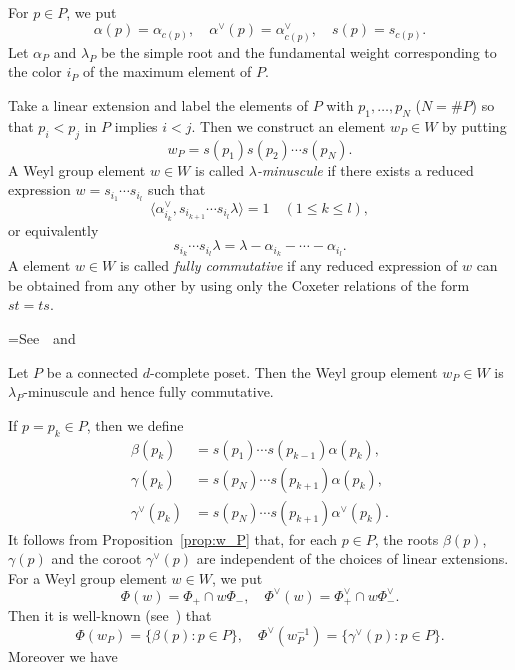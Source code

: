 For $p \in P$, we put
$$
\alpha(p) = \alpha_{c(p)},
\quad
\alpha^\vee(p) = \alpha^\vee_{c(p)},
\quad
s(p) = s_{c(p)}.
$$
Let $\alpha_P$ and $\lambda_P$ be the simple root and the fundamental weight 
corresponding to the color $i_P$ of the maximum element of $P$. 

Take a linear extension and label the elements of $P$ with $p_1, \ldots, p_N$ ($N= \# P$) 
so that $p_i < p_j$ in $P$ implies $i<j$.
Then we construct an element $w_P \in W$ by putting
$$
w_P = s(p_1) s(p_2) \cdots s(p_N).
$$
A Weyl group element $w \in W$ is called \emph{$\lambda$-minuscule} 
if there exists a reduced expression $w = s_{i_1} \cdots s_{i_l}$ such that
$$
\langle \alpha^\vee_{i_k}, s_{i_{k+1}} \cdots s_{i_l} \lambda \rangle = 1
\quad(1 \le k \le l),
$$
or equivalently
$$
s_{i_k} \cdots s_{i_l} \lambda = \lambda - \alpha_{i_k} - \cdots - \alpha_{i_l}.
$$
A element $w \in W$ is called \emph{fully commutative} 
if any reduced expression of $w$ can be obtained from any other by using only 
the Coxeter relations of the form $st = ts$.

\setbox\toto=\hbox{See~\cite{Proc2} and~\cite[Proposition~2.1]{Stem2}}
\begin{prop}[\box\toto]
\label{prop:w_P}
Let $P$ be a connected $d$-com\-plete poset.
Then the Weyl group element $w_P \in W$ is $\lambda_P$-minuscule and hence fully commutative.
\end{prop}

If $p = p_k \in P$, then we define 
\begin{align*}
\beta(p_k) &= s(p_1) \cdots s(p_{k-1}) \alpha(p_k),
\\
\gamma(p_k) &= s(p_N) \cdots s(p_{k+1}) \alpha(p_k),
\\
\gamma^\vee(p_k) &= s(p_N) \cdots s(p_{k+1}) \alpha^\vee(p_k).
\end{align*}
It follows from Proposition~\ref{prop:w_P} that, 
for each $p \in P$, the roots $\beta(p)$, $\gamma(p)$ and the coroot $\gamma^\vee(p)$ 
are independent of the choices of linear extensions.
For a Weyl group element $w \in W$, we put
$$
\Phi(w) = \Phi_+ \cap w \Phi_-,
\quad
\Phi^\vee(w) = \Phi^\vee_+ \cap w \Phi^\vee_-.
$$
Then it is well-known (see~\cite[\S~5.6]{H}) that
$$
\Phi(w_P) = \{ \beta(p) : p \in P \},
\quad
\Phi^\vee(w_P^{-1}) = \{ \gamma^\vee(p) : p \in P \}.
$$
Moreover we have

